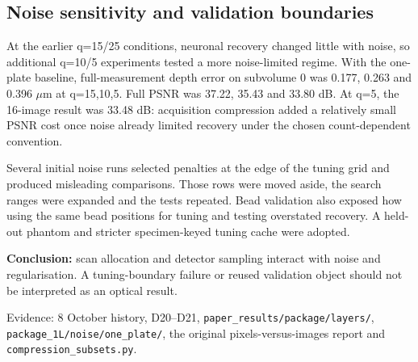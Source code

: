 \subsection{Noise sensitivity and validation boundaries}

At the earlier q=15/25 conditions, neuronal recovery changed little with noise, so additional q=10/5 experiments tested a more noise-limited regime. With the one-plate baseline, full-measurement depth error on subvolume 0 was 0.177, 0.263 and 0.396 \ensuremath{\mu}m at q=15,10,5. Full PSNR was 37.22, 35.43 and 33.80 dB. At q=5, the 16-image result was 33.48 dB: acquisition compression added a relatively small PSNR cost once noise already limited recovery under the chosen count-dependent convention.

Several initial noise runs selected penalties at the edge of the tuning grid and produced misleading comparisons. Those rows were moved aside, the search ranges were expanded and the tests repeated. Bead validation also exposed how using the same bead positions for tuning and testing overstated recovery. A held-out phantom and stricter specimen-keyed tuning cache were adopted.

\textbf{Conclusion:} scan allocation and detector sampling interact with noise and regularisation. A tuning-boundary failure or reused validation object should not be interpreted as an optical result.

Evidence: 8 October history, D20--D21, {\small\texttt{paper\_\allowbreak{}results/\allowbreak{}package/\allowbreak{}layers/\allowbreak{}}}, {\small\texttt{package\_\allowbreak{}1L/\allowbreak{}noise/\allowbreak{}one\_\allowbreak{}plate/\allowbreak{}}}, the original pixels-versus-images report and {\small\texttt{compression\_\allowbreak{}subsets.\allowbreak{}py}}.
